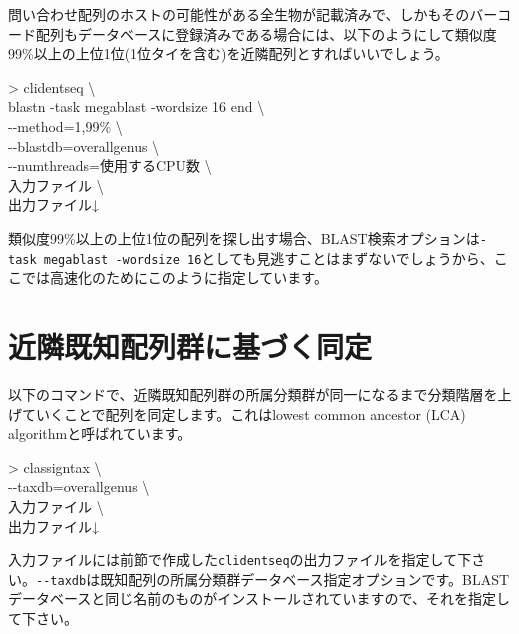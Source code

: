 \documentclass[titlepage,10pt,a4paper]{jsbook}
\newenvironment{cmd}{\begin{oframed}\raggedright\ttfamily\footnotesize\setlength{\baselineskip}{1.4em}}{\end{oframed}\vspace{-1em}}
\begin{document}
問い合わせ配列のホストの可能性がある全生物が記載済みで、しかもそのバーコード配列もデータベースに登録済みである場合には、以下のようにして類似度99\%以上の上位1位(1位タイを含む)を近隣配列とすればいいでしょう。
\begin{cmd}
{\textgreater} clidentseq {\textbackslash}\\
blastn -task megablast -word{\textunderscore}size 16 end {\textbackslash}\\
{-}{-}method=1,99\% {\textbackslash}\\
{-}{-}blastdb=overall{\textunderscore}genus {\textbackslash}\\
{-}{-}numthreads=使用するCPU数 {\textbackslash}\\
入力ファイル {\textbackslash}\\
出力ファイル↓
\end{cmd}

類似度99\%以上の上位1位の配列を探し出す場合、BLAST検索オプションは\texttt{-task megablast -word{\textunderscore}size 16}としても見逃すことはまずないでしょうから、ここでは高速化のためにこのように指定しています。

\section{近隣既知配列群に基づく同定}
以下のコマンドで、近隣既知配列群の所属分類群が同一になるまで分類階層を上げていくことで配列を同定します。これはlowest common ancestor (LCA) algorithmと呼ばれています\citep{Huson2007}。
\begin{cmd}
{\textgreater} classigntax {\textbackslash}\\
{-}{-}taxdb=overall{\textunderscore}genus {\textbackslash}\\
入力ファイル {\textbackslash}\\
出力ファイル↓
\end{cmd}
入力ファイルには前節で作成した\texttt{clidentseq}の出力ファイルを指定して下さい。\texttt{{-}{-}taxdb}は既知配列の所属分類群データベース指定オプションです。BLASTデータベースと同じ名前のものがインストールされていますので、それを指定して下さい。
\end{document}
